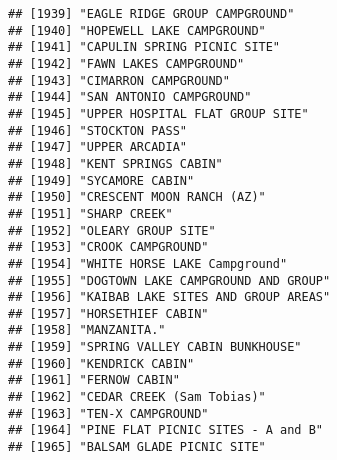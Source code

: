 \documentclass[
]{article}
\begin{document}
\begin{verbatim}
## [1939] "EAGLE RIDGE GROUP CAMPGROUND"                                                        
## [1940] "HOPEWELL LAKE CAMPGROUND"                                                            
## [1941] "CAPULIN SPRING PICNIC SITE"                                                          
## [1942] "FAWN LAKES CAMPGROUND"                                                               
## [1943] "CIMARRON CAMPGROUND"                                                                 
## [1944] "SAN ANTONIO CAMPGROUND"                                                              
## [1945] "UPPER HOSPITAL FLAT GROUP SITE"                                                      
## [1946] "STOCKTON PASS"                                                                       
## [1947] "UPPER ARCADIA"                                                                       
## [1948] "KENT SPRINGS CABIN"                                                                  
## [1949] "SYCAMORE CABIN"                                                                      
## [1950] "CRESCENT MOON RANCH (AZ)"                                                            
## [1951] "SHARP CREEK"                                                                         
## [1952] "OLEARY GROUP SITE"                                                                   
## [1953] "CROOK CAMPGROUND"                                                                    
## [1954] "WHITE HORSE LAKE Campground"                                                         
## [1955] "DOGTOWN LAKE CAMPGROUND AND GROUP"                                                   
## [1956] "KAIBAB LAKE SITES AND GROUP AREAS"                                                   
## [1957] "HORSETHIEF CABIN"                                                                    
## [1958] "MANZANITA."                                                                          
## [1959] "SPRING VALLEY CABIN BUNKHOUSE"                                                       
## [1960] "KENDRICK CABIN"                                                                      
## [1961] "FERNOW CABIN"                                                                        
## [1962] "CEDAR CREEK (Sam Tobias)"                                                            
## [1963] "TEN-X CAMPGROUND"                                                                    
## [1964] "PINE FLAT PICNIC SITES - A and B"                                                    
## [1965] "BALSAM GLADE PICNIC SITE"                                                            

\end{verbatim}
\end{document}
